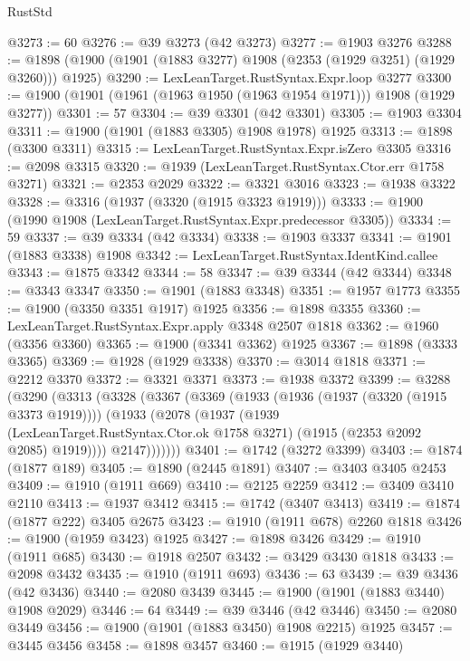 \begin{lexlean}{RustStd}
\begin{coremodule}
@3273 := 60
@3276 := @39 @3273 (@42 @3273)
@3277 := @1903 @3276
@3288 := @1898 (@1900 (@1901 (@1883 @3277) @1908 (@2353 (@1929 @3251) (@1929 @3260))) @1925)
@3290 := LexLeanTarget.RustSyntax.Expr.loop @3277
@3300 := @1900 (@1901 (@1961 (@1963 @1950 (@1963 @1954 @1971))) @1908 (@1929 @3277))
@3301 := 57
@3304 := @39 @3301 (@42 @3301)
@3305 := @1903 @3304
@3311 := @1900 (@1901 (@1883 @3305) @1908 @1978) @1925
@3313 := @1898 (@3300 @3311)
@3315 := LexLeanTarget.RustSyntax.Expr.isZero @3305
@3316 := @2098 @3315
@3320 := @1939 (LexLeanTarget.RustSyntax.Ctor.err @1758 @3271)
@3321 := @2353 @2029
@3322 := @3321 @3016
@3323 := @1938 @3322
@3328 := @3316 (@1937 (@3320 (@1915 @3323 @1919)))
@3333 := @1900 (@1990 @1908 (LexLeanTarget.RustSyntax.Expr.predecessor @3305))
@3334 := 59
@3337 := @39 @3334 (@42 @3334)
@3338 := @1903 @3337
@3341 := @1901 (@1883 @3338) @1908
@3342 := LexLeanTarget.RustSyntax.IdentKind.callee
@3343 := @1875 @3342
@3344 := 58
@3347 := @39 @3344 (@42 @3344)
@3348 := @3343 @3347
@3350 := @1901 (@1883 @3348)
@3351 := @1957 @1773
@3355 := @1900 (@3350 @3351 @1917) @1925
@3356 := @1898 @3355
@3360 := LexLeanTarget.RustSyntax.Expr.apply @3348 @2507 @1818
@3362 := @1960 (@3356 @3360)
@3365 := @1900 (@3341 @3362) @1925
@3367 := @1898 (@3333 @3365)
@3369 := @1928 (@1929 @3338)
@3370 := @3014 @1818
@3371 := @2212 @3370
@3372 := @3321 @3371
@3373 := @1938 @3372
@3399 := @3288
    (@3290
      (@3313
        (@3328
          (@3367
            (@3369
              (@1933
                (@1936 (@1937 (@3320 (@1915 @3373 @1919))))
                (@1933
                  (@2078
                    (@1937
                      (@1939
                        (LexLeanTarget.RustSyntax.Ctor.ok @1758 @3271)
                        (@1915 (@2353 @2092 @2085) @1919))))
                  @2147)))))))
@3401 := @1742 (@3272 @3399)
@3403 := @1874 (@1877 @189)
@3405 := @1890 (@2445 @1891)
@3407 := @3403 @3405 @2453
@3409 := @1910 (@1911 @669)
@3410 := @2125 @2259
@3412 := @3409 @3410 @2110
@3413 := @1937 @3412
@3415 := @1742 (@3407 @3413)
@3419 := @1874 (@1877 @222) @3405 @2675
@3423 := @1910 (@1911 @678) @2260 @1818
@3426 := @1900 (@1959 @3423) @1925
@3427 := @1898 @3426
@3429 := @1910 (@1911 @685)
@3430 := @1918 @2507
@3432 := @3429 @3430 @1818
@3433 := @2098 @3432
@3435 := @1910 (@1911 @693)
@3436 := 63
@3439 := @39 @3436 (@42 @3436)
@3440 := @2080 @3439
@3445 := @1900 (@1901 (@1883 @3440) @1908 @2029)
@3446 := 64
@3449 := @39 @3446 (@42 @3446)
@3450 := @2080 @3449
@3456 := @1900 (@1901 (@1883 @3450) @1908 @2215) @1925
@3457 := @3445 @3456
@3458 := @1898 @3457
@3460 := @1915 (@1929 @3440)

\end{coremodule}
\end{lexlean}
